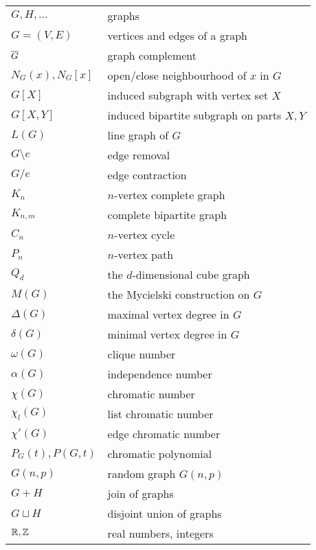 \begin{center}
\begin{tabular}{ll}
$G, H, \ldots$          	&  graphs \\
$G=(V,E)$					&  vertices and edges of a graph \\
$\overline{G}$					&  graph complement \\
$N_G(x), N_G[x]$			&  open/close neighbourhood of $x$ in $G$ \\
$G[X]$						&  induced subgraph with vertex set $X$ \\
$G[X,Y]$					&  induced bipartite subgraph on parts $X,Y$ \\
$L(G)$						&  line graph of $G$ \\
$G\setminus e$				&  edge removal \\
$G/e$						&  edge contraction \\
$K_n$						&  $n$-vertex complete graph \\
$K_{n,m}$					&  complete bipartite graph \\
$C_n$						&  $n$-vertex cycle \\
$P_n$						&  $n$-vertex path \\
$Q_d$						&  the $d$-dimensional cube graph \\
$M(G)$						&  the Mycielski construction on $G$ \\
$\Delta(G)$					&  maximal vertex degree in $G$ \\
$\delta(G)$					&  minimal vertex degree in $G$ \\
$\omega(G)$					&  clique number \\
$\alpha(G)$					&  independence number \\
$\chi(G)$					&  chromatic number \\
$\chi_l(G)$					&  list chromatic number \\
$\chi'(G)$					&  edge chromatic number \\
$P_G(t), P(G,t)$			&  chromatic polynomial \\
$G(n,p)$					&  random graph $G(n,p)$ \\
$G+H$						&  join of graphs \\
$G\sqcup H$					&  disjoint union of graphs \\
$\mathbb{R}, \mathbb{Z}$				&  real numbers, integers
\end{tabular}
\end{center}